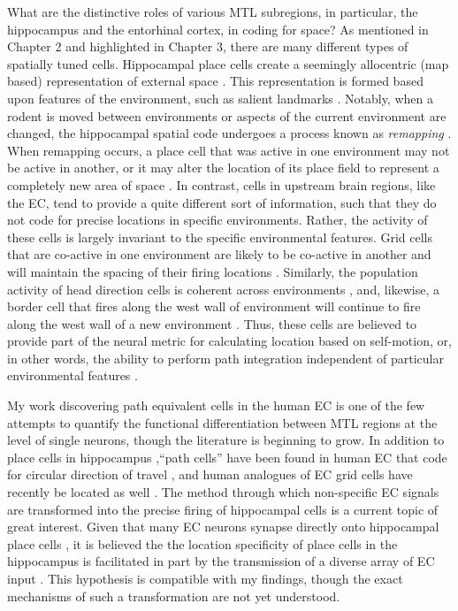 What are the distinctive roles of various MTL subregions, in particular, the hippocampus and the entorhinal cortex, in coding for space? As mentioned in Chapter 2 and highlighted in Chapter 3, there are many different types of spatially tuned cells. Hippocampal place cells create a seemingly allocentric (map based) representation of external space \citep{OKeeDost71,Mull96}. This representation is formed based upon features of the environment, such as salient landmarks \citep{OKeeBurg96}. Notably, when a rodent is moved between environments or aspects of the current environment are changed, the hippocampal spatial code undergoes a process known as \textit{remapping} \citep{MullKubi87}. When remapping occurs, a place cell that was active in one environment may not be active in another, or it may alter the location of its place field to represent a completely new area of space \citep{MarkEtal95a,LeutEtal04a,LeutEtal05}. In contrast, cells in upstream brain regions, like the EC, tend to provide a quite different sort of information, such that they do not code for precise locations in specific environments. Rather, the activity of these cells is largely invariant to the specific environmental features. Grid cells that are co-active in one environment are likely to be co-active in another and will maintain the spacing of their firing locations \citep{FyhnEtal07}. Similarly, the population activity of head direction cells is coherent across environments \citep{TaubEtal90}, and, likewise, a border cell that fires along the west wall of environment will continue to fire along the west wall of a new environment \citep{SolsEtal08}. Thus, these cells are believed to provide part of the neural metric for calculating location based on self-motion, or, in other words, the ability to perform path integration independent of particular environmental features \citep{JeffBurg06,BuzsMose13}.

My work discovering path equivalent cells in the human EC is one of the few attempts to quantify the functional differentiation between MTL regions at the level of single neurons, though the literature is beginning to grow. In addition to place cells in hippocampus \citep{EkstEtal03},``path cells'' have been found in human EC that code for circular direction of travel \citep{JacoEtal10}, and human analogues of EC grid cells have recently be located as well \citep{JacoEtal13}. The method through which non-specific EC signals are transformed into the precise firing of hippocampal cells is a current topic of great interest. Given that many EC neurons synapse directly onto hippocampal place cells \citep{ZhanEtal13}, it is believed the the location specificity of place cells in the hippocampus is facilitated in part by the transmission of a diverse array of EC input \citep{MoseMose13}. This hypothesis is  compatible with my findings, though the exact mechanisms of such a transformation are not yet understood.

